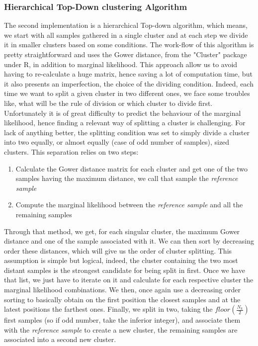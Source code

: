 \documentclass[twocolumn,12pt]{article}
\begin{document}
\subsubsection{Hierarchical Top-Down clustering Algorithm}

The second implementation is a hierarchical Top-down algorithm, which means, we start with all samples gathered in a single cluster and at each step we divide it in smaller clusters based on some conditions.
The work-flow of this algorithm is pretty straightforward and uses the Gower distance, from the "Cluster" package under R, in addition to marginal likelihood.
This approach allow us to avoid having to re-calculate a huge matrix, hence saving a lot of computation time, but it also presents an imperfection, the choice of the dividing condition.
Indeed, each time we want to split a given cluster in two different ones, we face some troubles like, what will be the rule of division or which cluster to divide first.
Unfortunately it is of great difficulty to predict the behaviour of the marginal likelihood, hence finding a relevant way of splitting a cluster is challenging.
For lack of anything better, the splitting condition was set to simply divide a cluster into two equally, or almost equally (case of odd number of samples), sized clusters. 
This separation relies on two steps:
\begin{enumerate}
    \item Calculate the Gower distance matrix for each cluster and get one of the two samples having the maximum distance, we call that sample the \emph{reference sample}
    \item Compute the marginal likelihood between the \emph{reference sample} and all the remaining samples
\end{enumerate}
Through that method, we get, for each singular cluster, the maximum Gower distance and one of the sample associated with it.
We can then sort by decreasing order these distances, which will give us the order of cluster splitting.
This assumption is simple but logical, indeed, the cluster containing the two most distant samples is the strongest candidate for being split in first.
Once we have that list, we just have to iterate on it and calculate for each respective cluster the marginal likelihood combinations.
We then, once again use a decreasing order sorting to basically obtain on the first position the closest samples and at the latest positions the farthest ones.
Finally, we split in two, taking the $floor(\frac{N_k}{2})$ first samples (so if odd number, take the inferior integer), and associate them with the \emph{reference sample} to create a new cluster, the remaining samples are associated into a second new cluster.
\end{document}
